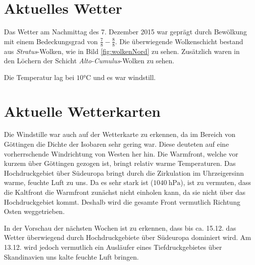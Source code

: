 \documentclass[12pt,a4paper,titlepage,headinclude,bibtotoc]{scrartcl}
\begin{document}
\section{Aktuelles Wetter}
Das Wetter am Nachmittag des 7. Dezember 2015 war geprägt durch Bewölkung mit einem Bedeckungsgrad von $\frac{7}{8}-\frac{8}{8}$.
Die überwiegende Wolkenschicht bestand aus \textit{Stratus}-Wolken, wie in Bild \ref{fig:wolkenNord} zu sehen.
Zusätzlich waren in den Löchern der Schicht \textit{Alto-Cumulus}-Wolken zu sehen.

Die Temperatur lag bei $10\si\celsius$ und es war windstill.


\section{Aktuelle Wetterkarten}
Die Windstille war auch auf der Wetterkarte zu erkennen, da im Bereich von Göttingen die Dichte der Isobaren sehr gering war.
Diese deuteten auf eine vorherrschende Windrichtung von Westen her hin.
Die Warmfront, welche vor kurzem über Göttingen gezogen ist, bringt relativ warme Temperaturen.
Das Hochdruckgebiet über Südeuropa bringt durch die Zirkulation im Uhrzeigersinn warme, feuchte Luft zu uns.
Da es sehr stark ist ($\SI{1040}{\hecto\pascal}$), ist zu vermuten, dass die Kaltfront die Warmfront zunächst nicht einholen kann, da sie nicht über das Hochdruckgebiet kommt.
Deshalb wird die gesamte Front vermutlich Richtung Osten weggetrieben.

In der Vorschau der nächsten Wochen ist zu erkennen, dass bis ca. 15.12. das Wetter überwiegend durch Hochdruckgebiete über Südeuropa dominiert wird.
Am 13.12. wird jedoch vermutlich ein Ausläufer eines Tiefdruckgebietes über Skandinavien uns kalte feuchte Luft bringen.
\end{document}
